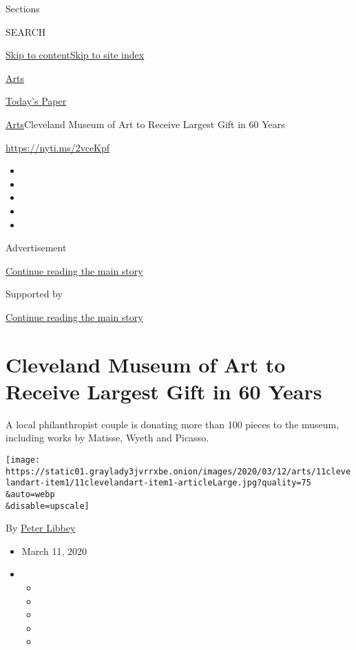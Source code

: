 Sections

SEARCH

\protect\hyperlink{site-content}{Skip to
content}\protect\hyperlink{site-index}{Skip to site index}

\href{https://www.nytimes3xbfgragh.onion/section/arts}{Arts}

\href{https://myaccount.nytimes3xbfgragh.onion/auth/login?response_type=cookie\&client_id=vi}{}

\href{https://www.nytimes3xbfgragh.onion/section/todayspaper}{Today's
Paper}

\href{/section/arts}{Arts}\textbar{}Cleveland Museum of Art to Receive
Largest Gift in 60 Years

\url{https://nyti.ms/2vceKpf}

\begin{itemize}
\item
\item
\item
\item
\item
\end{itemize}

Advertisement

\protect\hyperlink{after-top}{Continue reading the main story}

Supported by

\protect\hyperlink{after-sponsor}{Continue reading the main story}

\hypertarget{cleveland-museum-of-art-to-receive-largest-gift-in-60-years}{%
\section{Cleveland Museum of Art to Receive Largest Gift in 60
Years}\label{cleveland-museum-of-art-to-receive-largest-gift-in-60-years}}

A local philanthropist couple is donating more than 100 pieces to the
museum, including works by Matisse, Wyeth and Picasso.

\texttt{[image: https://static01.graylady3jvrrxbe.onion/images/2020/03/12/arts/11clevelandart-item1/11clevelandart-item1-articleLarge.jpg?quality=75\\\&auto=webp\\\&disable=upscale]}

By \href{https://www.nytimes3xbfgragh.onion/by/peter-libbey}{Peter
Libbey}

\begin{itemize}
\item
  March 11, 2020
\item
  \begin{itemize}
  \item
  \item
  \item
  \item
  \item
  \end{itemize}
\end{itemize}

